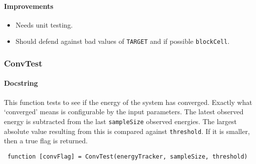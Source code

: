  \paragraph{Improvements}
 \begin{itemize}
 \item Needs unit testing.
 \item Should defend against bad values of \lstinline$TARGET$ and if possible \lstinline$blockCell$.
 \end{itemize}
 
 \subsubsection{ConvTest}
 \paragraph{Docstring} This function tests to see if the energy of the system has converged. Exactly what `converged' means is configurable by the input parameters. The latest observed energy is subtracted from the last \lstinline$sampleSize$ observed energies. The largest absolute value resulting from this is compared against \lstinline$threshold$. If it is smaller, then a true flag is returned.
 \begin{lstlisting}
 function [convFlag] = ConvTest(energyTracker, sampleSize, threshold) \end{lstlisting}
